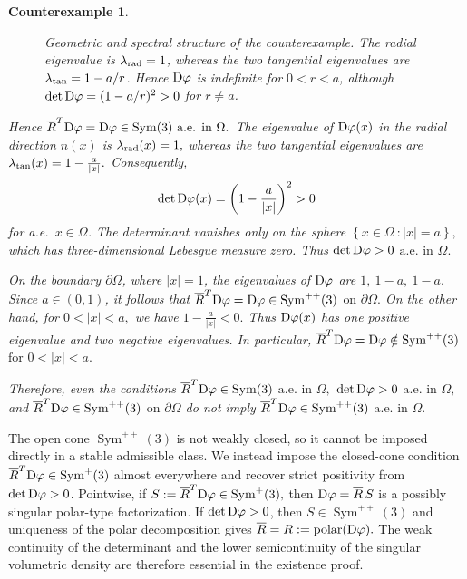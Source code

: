 \documentclass[11pt]{article}
\newtheorem{counterexample}[theorem]{Counterexample}
\begin{document}
\begin{counterexample}
\begin{figure}[t]
\caption{
Geometric and spectral structure of the counterexample.
The radial eigenvalue is $\lambda_{\rm rad}=1$, whereas the two tangential
eigenvalues are $\lambda_{\rm tan}=1-a/r$. Hence ${\rm D}\varphi$ is
indefinite for $0<r<a$, although
$\det{\rm D}\varphi=(1-a/r)^2>0$ for $r\neq a$.
}
\label{fig:counterexample-all}
\end{figure}
Hence
$
 \overline  R ^T{\rm D}\varphi
=
{\rm D}\varphi
\in\operatorname{Sym}(3)
\
\text{a.e. in }\Omega.
$
The eigenvalue of ${\rm D}\varphi(x)$ in the radial direction $n(x)$ is
$
\lambda_{\rm rad}(x)=1,
$
whereas the two tangential eigenvalues are
$
\lambda_{\rm tan}(x)
=
1-\frac{a}{|x|}.
$
Consequently,
\begin{align}
\det{\rm D}\varphi(x)
=
\left(
1-\frac{a}{|x|}
\right)^2
>0
\end{align}
for a.e.\ $x\in\Omega$. The determinant vanishes only on the sphere
$
\left\{
x\in\Omega~: |x|=a
\right\},
$
which has three-dimensional Lebesgue measure zero. Thus
$
\det{\rm D}\varphi>0
$ $
\text{a.e. in }\Omega.
$

On the boundary $\partial\Omega$, where $|x|=1$, the eigenvalues of
${\rm D}\varphi$ are
$
1,\  1-a,\  1-a.
$
Since $a\in(0,1)$, it follows that
$
 \overline R ^T{\rm D}\varphi
=
{\rm D}\varphi
\in\operatorname{Sym}^{++}(3)
$ $
\text{on }\partial\Omega.
$
On the other hand, for
$
0<|x|<a,
$
we have
$
1-\frac{a}{|x|}<0.
$
Thus ${\rm D}\varphi(x)$ has one positive eigenvalue and two negative
eigenvalues. In particular,
$
\overline  R ^T{\rm D}\varphi
=
{\rm D}\varphi
\notin\operatorname{Sym}^{++}(3)
$ $
\text{for }0<|x|<a.
$

Therefore, even the conditions
$
  \overline R ^T{\rm D}\varphi
\in\operatorname{Sym}(3)
 $ $
\text{a.e. in }\Omega,
$
$
\det{\rm D}\varphi>0
$  $
\text{a.e. in }\Omega,
$
and
$
  \overline R ^T{\rm D}\varphi
\in\operatorname{Sym}^{++}(3)
$ $
\text{on }\partial\Omega
$
do not imply
$
 \overline R ^T{\rm D}\varphi
\in\operatorname{Sym}^{++}(3)
$ $
\text{a.e. in }\Omega.
$
\end{counterexample}


The open cone $\operatorname{Sym}^{++}(3)$ is not weakly closed, so it cannot be imposed directly in a stable admissible class. We instead impose the closed-cone condition
$
 \overline R ^T{\rm D}\varphi\in\operatorname{Sym}^{+}(3)
$
almost everywhere and recover strict positivity from $\det{\rm D}\varphi>0$. Pointwise, if
$
S:= \overline R ^T{\rm D}\varphi\in\operatorname{Sym}^{+}(3),
$
then ${\rm D}\varphi= \overline R\,  S$ is a possibly singular polar-type factorization. If $\det{\rm D}\varphi>0$, then $S\in\operatorname{Sym}^{++}(3)$ and uniqueness of the polar decomposition gives
$
 \overline R =R:=\operatorname{polar}({\rm D}\varphi).
$
The weak continuity of the determinant and the lower semicontinuity of the singular volumetric density are therefore essential in the existence proof.
\end{document}
